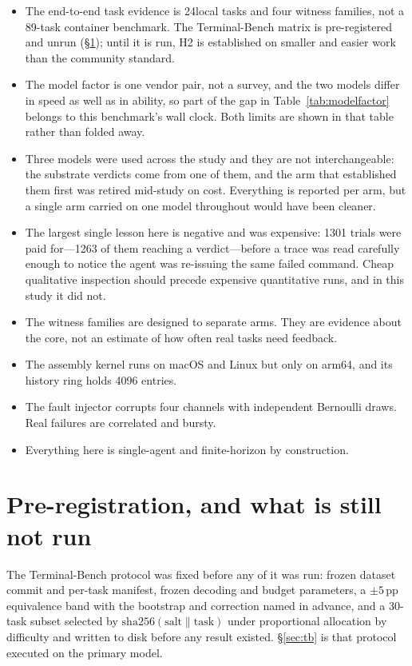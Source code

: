 \documentclass[11pt,a4paper]{article}
\begin{document}
\begin{itemize}
\item The end-to-end task evidence is 24local tasks and four witness
families, not a 89-task container benchmark. The Terminal-Bench matrix is
pre-registered and unrun (\S\ref{sec:notrun}); until it is run, H2 is
established on smaller and easier work than the community standard.
\item The model factor is one vendor pair, not a survey, and the two models
differ in speed as well as in ability, so part of the gap in
Table~\ref{tab:modelfactor} belongs to this benchmark's wall clock. Both limits
are shown in that table rather than folded away.
\item Three models were used across the study and they are not interchangeable:
the substrate verdicts come from one of them, and the arm that established them
first was retired mid-study on cost. Everything is reported per arm, but a
single arm carried on one model throughout would have been cleaner.
\item The largest single lesson here is negative and was expensive: 1301 trials
were paid for---1263 of them reaching a verdict---before a trace was read
carefully enough to notice the agent was re-issuing the same failed command. Cheap qualitative inspection should precede
expensive quantitative runs, and in this study it did not.
\item The witness families are designed to separate arms. They are evidence
about the core, not an estimate of how often real tasks need feedback.
\item The assembly kernel runs on macOS and Linux but only on arm64, and its
history ring holds 4096 entries.
\item The fault injector corrupts four channels with independent Bernoulli
draws. Real failures are correlated and bursty.
\item Everything here is single-agent and finite-horizon by construction.
\end{itemize}

\section{Pre-registration, and what is still not run}
\label{sec:notrun}

The Terminal-Bench protocol was fixed before any of it was run: frozen dataset
commit and per-task manifest, frozen decoding and budget parameters, a
$\pm5$\,pp equivalence band with the bootstrap and correction named in advance,
and a 30-task subset selected by $\mathrm{sha256}(\text{salt} \| \text{task})$
under proportional allocation by difficulty and written to disk before any
result existed. \S\ref{sec:tb} is that protocol executed on the primary model.
\end{document}
